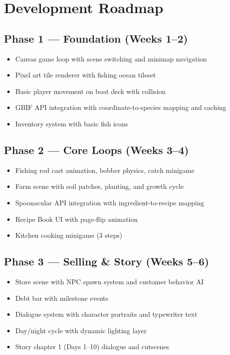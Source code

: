 \documentclass[11pt, letterpaper]{article}
\begin{document}
\section{Development Roadmap}

\subsection*{Phase 1 --- Foundation (Weeks 1--2)}
\begin{itemize}
  \item Canvas game loop with scene switching and minimap navigation
  \item Pixel art tile renderer with fishing ocean tileset
  \item Basic player movement on boat deck with collision
  \item GBIF API integration with coordinate-to-species mapping and caching
  \item Inventory system with basic fish icons
\end{itemize}

\subsection*{Phase 2 --- Core Loops (Weeks 3--4)}
\begin{itemize}
  \item Fishing rod cast animation, bobber physics, catch minigame
  \item Farm scene with soil patches, planting, and growth cycle
  \item Spoonacular API integration with ingredient-to-recipe mapping
  \item Recipe Book UI with page-flip animation
  \item Kitchen cooking minigame (3 steps)
\end{itemize}

\subsection*{Phase 3 --- Selling \& Story (Weeks 5--6)}
\begin{itemize}
  \item Store scene with NPC spawn system and customer behavior AI
  \item Debt bar with milestone events
  \item Dialogue system with character portraits and typewriter text
  \item Day/night cycle with dynamic lighting layer
  \item Story chapter 1 (Days 1--10) dialogue and cutscenes
\end{itemize}
\end{document}
